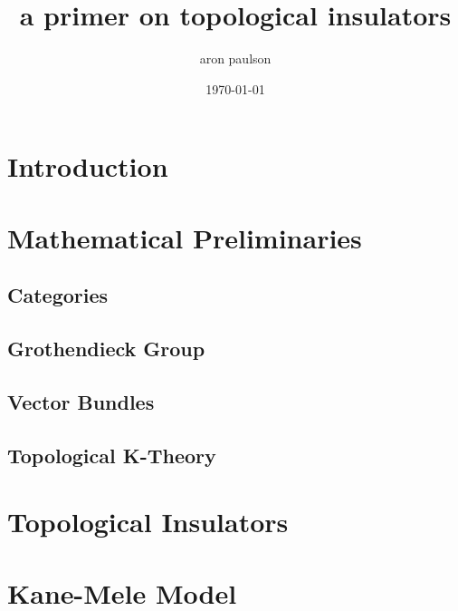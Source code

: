 \documentclass[a4paper,11pt,psamsfonts,reqno]{amsart}
\newcounter{prpcounter}
\theoremstyle{proposition}
\theoremstyle{proof}
\begin{document}
\title{a primer on topological insulators}
\author{aron paulson}
\date{\today}
\maketitle
\tableofcontents

\setcounter{prpcounter}{0}





\section{Introduction}
\label{sec:intro}



\section{Mathematical Preliminaries}
\label{sec:mathpre}


\subsection*{Categories}
\label{sec:categories}


\subsection*{Grothendieck Group}
\label{sec:grothengr}


\subsection*{Vector Bundles}
\label{sec:vb}


\subsection*{Topological K-Theory}
\label{sec:topktheory}



\section{Topological Insulators}
\label{sec:topins}



\section{Kane-Mele Model}
\label{sec:kmm}



\nocite{wiki-pedia0en}



\end{document}
